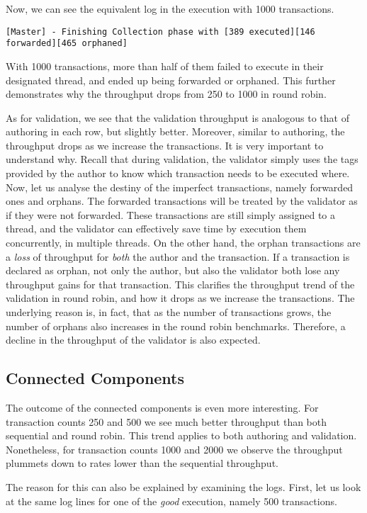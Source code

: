Now, we can see the equivalent log in the execution with 1000 transactions.

\begin{lstlisting}
[Master] - Finishing Collection phase with [389 executed][146 forwarded][465 orphaned]
\end{lstlisting}

With 1000 transactions, more than half of them failed to execute in their designated thread, and
ended up being forwarded or orphaned. This further demonstrates why the throughput drops from 250 to
1000 in round robin.

As for validation, we see that the validation throughput is analogous to that of authoring in each
row, but slightly better. Moreover, similar to authoring, the throughput drops as we increase the
transactions. It is very important to understand why. Recall that during validation, the validator
simply uses the tags provided by the author to know which transaction needs to be executed where.
Now, let us analyse the destiny of the imperfect transactions, namely forwarded ones and orphans.
The forwarded transactions will be treated by the validator as if they were not forwarded. These
transactions are still simply assigned to a thread, and the validator can effectively save time by
execution them concurrently, in multiple threads. On the other hand, the orphan transactions are a
\textit{loss} of throughput for \textit{both} the author and the transaction. If a transaction is
declared as orphan, not only the author, but also the validator both lose any throughput gains for
that transaction. This clarifies the throughput trend of the validation in round robin, and how it
drops as we increase the transactions. The underlying reason is, in fact, that as the number of
transactions grows, the number of orphans also increases in the round robin benchmarks. Therefore, a
decline in the throughput of the validator is also expected.

\subsection*{Connected Components}
The outcome of the connected components is even more interesting. For transaction counts 250 and 500
we see much better throughput than both sequential and round robin. This trend applies to both
authoring and validation. Nonetheless, for transaction counts 1000 and 2000 we observe the
throughput plummets down to rates lower than the sequential throughput.

The reason for this can also be explained by examining the logs. First, let us look at the same log
lines for one of the \textit{good} execution, namely 500 transactions.

